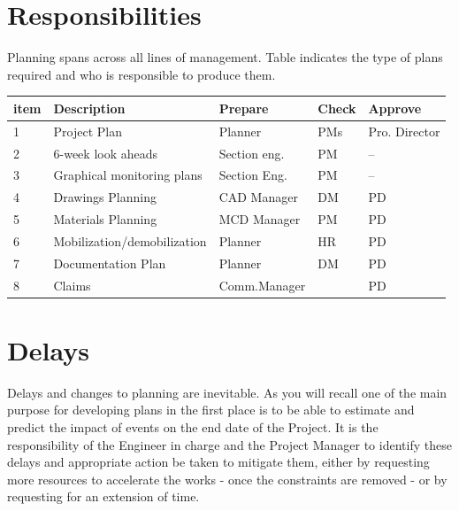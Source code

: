 

\section*{Responsibilities}

Planning spans across all lines of management. Table indicates the type of plans
required and who is responsible to produce them.

\begin{tabular}{lllll}
\toprule
item  &Description            &Prepare   &Check &Approve \\
\midrule
1 &Project Plan               &Planner   &PMs   &Pro. Director\\
2 &6-week look aheads         &Section eng. &PM  &--\\ 
3 &Graphical monitoring plans &Section Eng. &PM  &--\\
4 &Drawings Planning          &CAD Manager  &DM  &PD\\
5 &Materials Planning         &MCD Manager  &PM  &PD\\
6 &Mobilization/demobilization &Planner     &HR  &PD\\
7 &Documentation Plan         &Planner      &DM  &PD\\
8 &Claims                     &Comm.Manager &    &PD\\
\bottomrule
\end{tabular}


\section*{Delays}

Delays and changes to planning are inevitable. As you will recall one of the main 
purpose for developing plans in the first place is to be able to estimate and predict
the impact of events on the end date of the Project. It is the responsibility of the 
Engineer in charge and the Project Manager to identify these delays and appropriate
action be taken to mitigate them, either by requesting more resources to accelerate
the works - once the constraints are removed - or by requesting for an extension
of time.

























